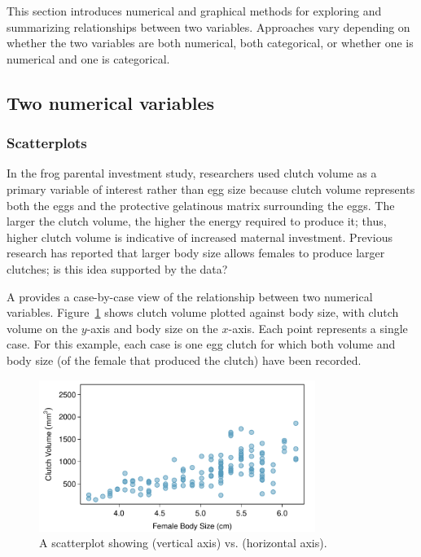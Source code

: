 This section introduces numerical and graphical methods for exploring and summarizing relationships between two variables. Approaches vary depending on whether the two variables are both numerical, both categorical, or whether one is numerical and one is categorical.

\subsection{Two numerical variables}

\subsubsection{Scatterplots}
\label{scatterPlots}

In the frog parental investment study, researchers used clutch volume as a primary variable of interest rather than egg size because clutch volume represents both the eggs and the protective gelatinous matrix surrounding the eggs. The larger the clutch volume, the higher the energy required to produce it; thus, higher clutch volume is indicative of increased maternal investment. Previous research has reported that larger body size allows females to produce larger clutches; is this idea supported by the  data?

A  provides a case-by-case view of the relationship between two numerical variables. Figure~\ref{frogClutchVolBodySize} shows clutch volume plotted against body size, with clutch volume on the $y$-axis and body size on the $x$-axis. Each point represents a single case. For this example, each case is one egg clutch for which both volume and body size (of the female that produced the clutch) have been recorded.

\begin{figure}[h]
	\centering
	\includegraphics[width=0.8\textwidth]
	{ch_intro_to_data_oi_biostat/figures/frogClutchVolBodySize/frogClutchVolBodySize}
	\caption{A scatterplot showing  (vertical axis) vs.  (horizontal axis). }
	\label{frogClutchVolBodySize}
\end{figure}


